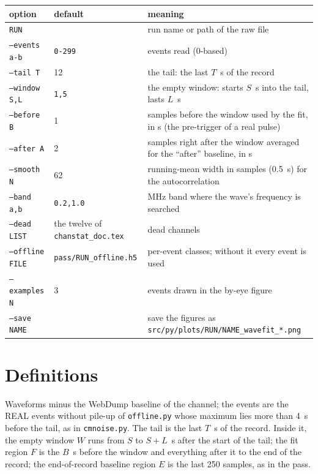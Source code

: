 \documentclass[11pt]{article}
\newcommand{\code}[1]{\texttt{#1}}
\newcommand{\us}{\textmu s}
\begin{document}
\begin{center}
\begin{tabular}{l l p{78mm}}
\toprule
option & default & meaning \\
\midrule
\code{RUN} & & run name or path of the raw file \\
\code{--events a-b} & \code{0-299} & events read (0-based) \\
\code{--tail T} & 12 & the tail: the last $T$~\us{} of the record \\
\code{--window S,L} & \code{1,5} & the empty window: starts $S$~\us{} into the tail, lasts $L$~\us \\
\code{--before B} & 1 & samples before the window used by the fit, in \us{} (the pre-trigger of a real pulse) \\
\code{--after A} & 2 & samples right after the window averaged for the ``after'' baseline, in \us \\
\code{--smooth N} & 62 & running-mean width in samples (0.5~\us) for the autocorrelation \\
\code{--band a,b} & \code{0.2,1.0} & MHz band where the wave's frequency is searched \\
\code{--dead LIST} & the twelve of \code{chanstat\_doc.tex} & dead channels \\
\code{--offline FILE} & \code{pass/RUN\_offline.h5} & per-event classes; without it every event is used \\
\code{--examples N} & 3 & events drawn in the by-eye figure \\
\code{--save NAME} & & save the figures as \code{src/py/plots/RUN/NAME\_wavefit\_*.png} \\
\bottomrule
\end{tabular}
\end{center}

\section{Definitions}

Waveforms minus the WebDump baseline of the channel; the events are the
REAL events without pile-up of \code{offline.py} whose maximum lies more
than 4~\us{} before the tail, as in \code{cmnoise.py}. The tail is the last
$T$~\us{} of the record. Inside it, the empty window $W$ runs from $S$ to
$S + L$~\us{} after the start of the tail; the fit region $F$ is the $B$~\us{}
before the window and everything after it to the end of the record; the
end-of-record baseline region $E$ is the last 250 samples, as in the pass.
\end{document}
